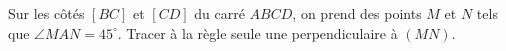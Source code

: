 Sur les côtés $[BC]$ et $[CD]$ du carré $ABCD$, on prend des points $M$ et $N$ tels que $\angle MAN = 45^\circ$. Tracer à la règle seule une perpendiculaire à $(MN)$.
